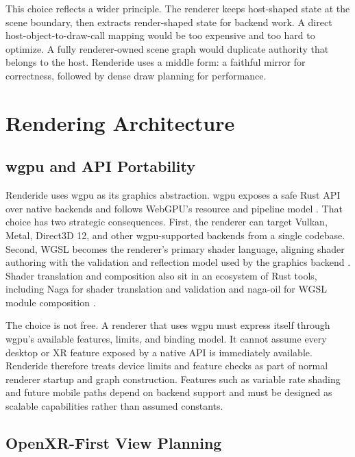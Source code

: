 \documentclass[acmtog,screen,nonacm]{acmart}
\begin{document}
This choice reflects a wider principle. The renderer keeps host-shaped state at the scene boundary, then extracts render-shaped state for backend work. A direct host-object-to-draw-call mapping would be too expensive and too hard to optimize. A fully renderer-owned scene graph would duplicate authority that belongs to the host. Renderide uses a middle form: a faithful mirror for correctness, followed by dense draw planning for performance.

\section{Rendering Architecture}

\subsection{wgpu and API Portability}

Renderide uses wgpu as its graphics abstraction. wgpu exposes a safe Rust API over native backends and follows WebGPU's resource and pipeline model \citep{wgpuDocs,webgpuSpec}. That choice has two strategic consequences. First, the renderer can target Vulkan, Metal, Direct3D 12, and other wgpu-supported backends from a single codebase. Second, WGSL becomes the renderer's primary shader language, aligning shader authoring with the validation and reflection model used by the graphics backend \citep{wgslSpec}. Shader translation and composition also sit in an ecosystem of Rust tools, including Naga for shader translation and validation and naga-oil for WGSL module composition \citep{nagaRepo,nagaOilRepo}.

The choice is not free. A renderer that uses wgpu must express itself through wgpu's available features, limits, and binding model. It cannot assume every desktop or XR feature exposed by a native API is immediately available. Renderide therefore treats device limits and feature checks as part of normal renderer startup and graph construction. Features such as variable rate shading and future mobile paths depend on backend support and must be designed as scalable capabilities rather than assumed constants.

\subsection{OpenXR-First View Planning}
\end{document}
